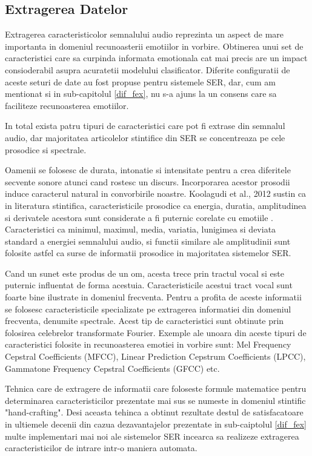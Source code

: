 \documentclass[a4paper,12pt]{book}
\begin{document}
					\subsection{Extragerea Datelor}
						Extragerea caracteristicolor semnalului audio reprezinta un aspect de mare importanta in domeniul recunoasterii emotiilor in vorbire. Obtinerea unui set de caracteristici care sa curpinda informata emotionala cat mai precis are un impact consioderabil asupra acuratetii modelului clasificator. Diferite configuratii de aceste seturi de date au fost propuse pentru sistemele SER, dar, cum am mentionat si in sub-capitolul \ref{dif_fex}, nu s-a ajuns la un consens care sa faciliteze recunoasterea emotiilor. \par
						In total exista patru tipuri de caracteristici care pot fi extrase din semnalul audio, dar majoritatea articolelor stintifice din SER se concentreaza pe cele prosodice si spectrale.\par
						Oamenii se folosesc de durata, intonatie si intensitate pentru a crea diferitele secvente sonore atunci cand rostesc un discurs. Incorporarea acestor prosodii induce caracterul natural in convorbirile noastre. Koolagudi et al., 2012 \cite{koolagudi} sustin ca in literatura stintifica, caracteristicile prosodice ca energia, duratia, amplitudinea si derivatele acestora sunt considerate a fi puternic corelate cu emotiile \cite{dellaert,hcf2,hcf3}. Caracteristici ca minimul, maximul, media, variatia, lunigimea si deviata standard a energiei semnalului audio, si functii similare ale amplitudinii sunt folosite astfel ca surse de informatii prosodice in majoritatea sistemelor SER. \par
						Cand un sunet este produs de un om, acesta trece prin tractul vocal si este puternic influentat de forma acestuia. Caracteristicile acestui tract vocal sunt foarte bine ilustrate in domeniul frecventa. Pentru a profita de aceste informatii se folosesc caracteristicile specializate pe extragerea informatiei din domeniul frecventa, denumite spectrale. Acest tip de caracteristici sunt obtinute prin folosirea celebrelor transformate Fourier. Exemple ale unoara din aceste tipuri de caracteristici folosite in recunoasterea emotiei in vorbire sunt: Mel Frequency Cepstral Coefficients (MFCC), Linear Prediction Cepstrum Coefficients (LPCC), Gammatone Frequency Cepstral Coefficients (GFCC) etc. \par 
						Tehnica care de extragere de informatii care foloseste formule matematice pentru determinarea caracteristicilor prezentate mai sus se numeste in domeniul stintific "hand-crafting". Desi aceasta tehinca a obtinut rezultate destul de satisfacatoare in ultiemele decenii din cazua dezavantajelor prezentate in sub-caiptolul \ref{dif_fex} multe implementari mai noi ale sistemelor SER incearca sa realizeze extragerea caracteristicilor de intrare intr-o maniera automata. \par
\end{document}
